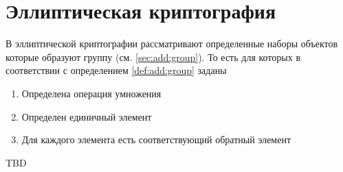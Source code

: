 \section{Эллиптическая криптография}

В эллиптической криптографии рассматривают определенные наборы
объектов которые образуют группу (см. \autoref{sec:add:group}). То
есть для которых в соответствии с определением \ref{def:add:group}
заданы 
\begin{enumerate}
\item Определена операция умножения
\item Определен единичный элемент
\item Для каждого элемента есть соответствующий обратный элемент
\end{enumerate}
TBD
